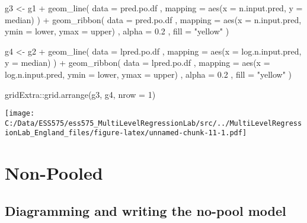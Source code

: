 \documentclass[
]{article}
\newenvironment{Shaded}{\begin{snugshade}}{\end{snugshade}}
\newcommand{\AttributeTok}[1]{\textcolor[rgb]{0.77,0.63,0.00}{#1}}
\newcommand{\DecValTok}[1]{\textcolor[rgb]{0.00,0.00,0.81}{#1}}
\newcommand{\FloatTok}[1]{\textcolor[rgb]{0.00,0.00,0.81}{#1}}
\newcommand{\FunctionTok}[1]{\textcolor[rgb]{0.00,0.00,0.00}{#1}}
\newcommand{\NormalTok}[1]{#1}
\newcommand{\OtherTok}[1]{\textcolor[rgb]{0.56,0.35,0.01}{#1}}
\newcommand{\SpecialCharTok}[1]{\textcolor[rgb]{0.00,0.00,0.00}{#1}}
\newcommand{\StringTok}[1]{\textcolor[rgb]{0.31,0.60,0.02}{#1}}
\begin{document}
\begin{Shaded}
\begin{Highlighting}[]
\NormalTok{g3 }\OtherTok{\textless{}{-}}\NormalTok{ g1 }\SpecialCharTok{+}
  \FunctionTok{geom\_line}\NormalTok{(}
    \AttributeTok{data =}\NormalTok{ pred.po.df}
\NormalTok{    , }\AttributeTok{mapping =} \FunctionTok{aes}\NormalTok{(}\AttributeTok{x =}\NormalTok{ n.input.pred, }\AttributeTok{y =}\NormalTok{ median)}
\NormalTok{  ) }\SpecialCharTok{+}
  \FunctionTok{geom\_ribbon}\NormalTok{(}
    \AttributeTok{data =}\NormalTok{ pred.po.df}
\NormalTok{    , }\AttributeTok{mapping =} \FunctionTok{aes}\NormalTok{(}\AttributeTok{x =}\NormalTok{ n.input.pred, }\AttributeTok{ymin =}\NormalTok{ lower, }\AttributeTok{ymax =}\NormalTok{ upper)}
\NormalTok{    , }\AttributeTok{alpha =} \FloatTok{0.2}
\NormalTok{    , }\AttributeTok{fill =} \StringTok{"yellow"}
\NormalTok{  )}

\NormalTok{g4 }\OtherTok{\textless{}{-}}\NormalTok{ g2 }\SpecialCharTok{+}
  \FunctionTok{geom\_line}\NormalTok{(}
    \AttributeTok{data =}\NormalTok{ lpred.po.df}
\NormalTok{    , }\AttributeTok{mapping =} \FunctionTok{aes}\NormalTok{(}\AttributeTok{x =}\NormalTok{ log.n.input.pred, }\AttributeTok{y =}\NormalTok{ median)}
\NormalTok{  ) }\SpecialCharTok{+}
  \FunctionTok{geom\_ribbon}\NormalTok{(}
    \AttributeTok{data =}\NormalTok{ lpred.po.df}
\NormalTok{    , }\AttributeTok{mapping =} \FunctionTok{aes}\NormalTok{(}\AttributeTok{x =}\NormalTok{ log.n.input.pred, }\AttributeTok{ymin =}\NormalTok{ lower, }\AttributeTok{ymax =}\NormalTok{ upper)}
\NormalTok{    , }\AttributeTok{alpha =} \FloatTok{0.2}
\NormalTok{    , }\AttributeTok{fill =} \StringTok{"yellow"}
\NormalTok{  )}

\NormalTok{gridExtra}\SpecialCharTok{::}\FunctionTok{grid.arrange}\NormalTok{(g3, g4, }\AttributeTok{nrow =} \DecValTok{1}\NormalTok{)}
\end{Highlighting}
\end{Shaded}

\texttt{[image: C:/Data/ESS575/ess575\_MultiLevelRegressionLab/src/../MultiLevelRegressionLab\_England\_files/figure-latex/unnamed-chunk-11-1.pdf]}

\hypertarget{non-pooled}{%
\section{Non-Pooled}\label{non-pooled}}

\hypertarget{diagramming-and-writing-the-no-pool-model}{%
\subsection{Diagramming and writing the no-pool
model}\label{diagramming-and-writing-the-no-pool-model}}
\end{document}
